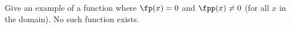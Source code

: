 {Give an example of a function where $\fp(x) = 0$ and $\fpp(x) \neq 0$ (for all $x$ in the domain).
}
{No such function exists.
}
